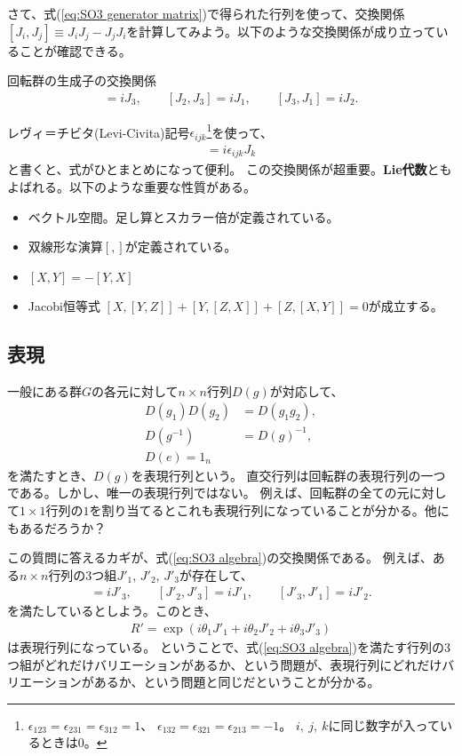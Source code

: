 \documentclass[10pt,a4paper]{jarticle}
\begin{document}
さて、式(\ref{eq:SO3 generator matrix})で得られた行列を使って、交換関係$[J_i, J_j]\equiv J_i J_j - J_j J_i$を計算してみよう。以下のような交換関係が成り立っていることが確認できる。
\begin{itembox}[l]{回転群の生成子の交換関係}
\begin{align}
[J_1, J_2] = i J_3, \qquad
[J_2, J_3] = i J_1, \qquad
[J_3, J_1] = i J_2. \label{eq:SO3 algebra}
\end{align}
\end{itembox}
レヴィ＝チビタ(Levi-Civita)記号$\epsilon_{ijk}$\footnote{
$\epsilon_{123} = \epsilon_{231} = \epsilon_{312} = 1$、
$\epsilon_{132} = \epsilon_{321} = \epsilon_{213} = -1$。
$i,~j,~k$に同じ数字が入っているときは0。}を使って、
\begin{align}
[J_i, J_j] = i\epsilon_{ijk} J_k
\end{align}
と書くと、式がひとまとめになって便利。
この交換関係が超重要。\textbf{Lie代数}ともよばれる。以下のような重要な性質がある。
\begin{itemize}
\item ベクトル空間。足し算とスカラー倍が定義されている。
\item 双線形な演算$[,]$が定義されている。
\item $[X,Y] = -[Y,X]$
\item Jacobi恒等式 $[X,[Y,Z]] + [Y, [Z,X]] + [Z,[X,Y]] = 0$が成立する。
\end{itemize}

\subsection{表現}
一般にある群$G$の各元に対して$n \times n$行列$D(g)$が対応して、
\begin{align}
D(g_1) D(g_2) &= D(g_1 g_2), \\
D(g^{-1}) &= D(g)^{-1}, \\
D(e) = 1_n
\end{align}
を満たすとき、$D(g)$を表現行列という。
直交行列は回転群の表現行列の一つである。しかし、唯一の表現行列ではない。
例えば、回転群の全ての元に対して$1\times 1$行列の$1$を割り当てるとこれも表現行列になっていることが分かる。他にもあるだろうか？

この質問に答えるカギが、式(\ref{eq:SO3 algebra})の交換関係である。
例えば、ある$n\times n$行列の3つ組$J'_1$, $J'_2$, $J'_3$が存在して、
\begin{align}
[J'_1, J'_2] = i J'_3, \qquad
[J'_2, J'_3] = i J'_1, \qquad
[J'_3, J'_1] = i J'_2.
\end{align}
を満たしているとしよう。このとき、
\begin{align}
R' = \exp\left( i \theta_1 J'_1 + i \theta_2 J'_2 + i\theta_3 J'_3 \right)
\end{align}
は表現行列になっている。
ということで、式(\ref{eq:SO3 algebra})を満たす行列の3つ組がどれだけバリエーションがあるか、という問題が、表現行列にどれだけバリエーションがあるか、という問題と同じだということが分かる。
\end{document}
